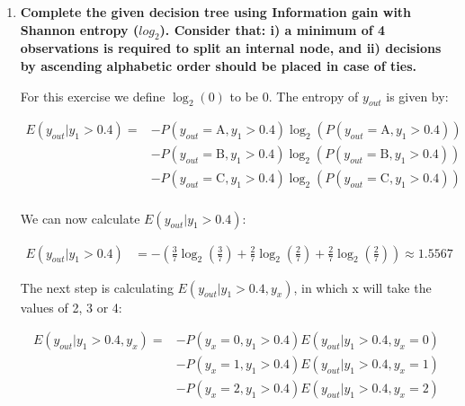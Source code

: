 \documentclass[12pt]{article}
\begin{document}
\begin{enumerate}[leftmargin=\labelsep]
    \item \textbf{Complete the given decision tree using Information gain with Shannon entropy ($log_2$).
    Consider that: i) a minimum of 4 observations is required to split an internal node, and
    ii) decisions by ascending alphabetic order should be placed in case of ties.}

    \vskip 0.3cm
    For this exercise we define $\log_2\left(0\right)$ to be 0. The entropy of \(y_{out}\) is given by:

    \begin{equation}
        \begin{split}
            E(y_{out} |y_1 > 0.4) =
            & - P(y_{out} = \text{A}, y_1 > 0.4) \log_2 \left(P(y_{out} = \text{A}, y_1 > 0.4)\right) \\
            & - P(y_{out} = \text{B}, y_1 > 0.4) \log_2 \left(P(y_{out} = \text{B}, y_1 > 0.4)\right)      \\
            & - P(y_{out} = \text{C}, y_1 > 0.4) \log_2 \left(P(y_{out} = \text{C}, y_1 > 0.4)\right)      \\
        \end{split}
    \end{equation}

    We can now calculate $E(y_{out} |y_1 > 0.4)$:

    \[
        \begin{aligned}
            E(y_{out} |y_1 > 0.4) & = - \left(\frac{3}{7} \log_2\left(\frac{3}{7}\right) + \frac{2}{7} \log_2\left(\frac{2}{7}\right)
                            + \frac{2}{7} \log_2\left(\frac{2}{7}\right)\right) \approx 1.5567
        \end{aligned}
    \]

    The next step is calculating $E(y_{out} | y_1 > 0.4 , y_x)$, in which x will take the values of 2, 3 or 4:

    \begin{equation}\label{exI1-e-yout-y2}
        \begin{split}
            E(y_{out} |y_1 > 0.4 , y_x) =
            & - P(y_x = 0, y_1 > 0.4) E(y_{out} | y_1 > 0.4 , y_x = 0) \\
            & - P(y_x = 1, y_1 > 0.4) E(y_{out} | y_1 > 0.4 , y_x = 1) \\
            & - P(y_x = 2, y_1 > 0.4) E(y_{out} | y_1 > 0.4 , y_x = 2)
        \end{split}
    \end{equation}


\end{enumerate}
\end{document}
